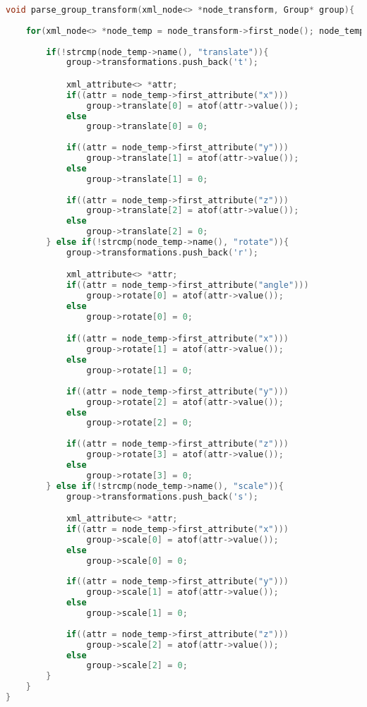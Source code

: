 \documentclass[14pt, a4 paper]{report}
\begin{document}
\begin{lstlisting}[language = c++]
void parse_group_transform(xml_node<> *node_transform, Group* group){
    
    for(xml_node<> *node_temp = node_transform->first_node(); node_temp; node_temp = node_temp->next_sibling()){
        
        if(!strcmp(node_temp->name(), "translate")){
            group->transformations.push_back('t');

            xml_attribute<> *attr;
            if((attr = node_temp->first_attribute("x")))
                group->translate[0] = atof(attr->value());
            else
                group->translate[0] = 0;
        
            if((attr = node_temp->first_attribute("y")))
                group->translate[1] = atof(attr->value());
            else
                group->translate[1] = 0;
        
            if((attr = node_temp->first_attribute("z")))
                group->translate[2] = atof(attr->value());
            else
                group->translate[2] = 0;
        } else if(!strcmp(node_temp->name(), "rotate")){
            group->transformations.push_back('r');

            xml_attribute<> *attr;
            if((attr = node_temp->first_attribute("angle")))
                group->rotate[0] = atof(attr->value());
            else
                group->rotate[0] = 0;

            if((attr = node_temp->first_attribute("x")))
                group->rotate[1] = atof(attr->value());
            else
                group->rotate[1] = 0;
        
            if((attr = node_temp->first_attribute("y")))
                group->rotate[2] = atof(attr->value());
            else
                group->rotate[2] = 0;
        
            if((attr = node_temp->first_attribute("z")))
                group->rotate[3] = atof(attr->value());
            else
                group->rotate[3] = 0;
        } else if(!strcmp(node_temp->name(), "scale")){
            group->transformations.push_back('s');

            xml_attribute<> *attr;
            if((attr = node_temp->first_attribute("x")))
                group->scale[0] = atof(attr->value());
            else
                group->scale[0] = 0;
        
            if((attr = node_temp->first_attribute("y")))
                group->scale[1] = atof(attr->value());
            else
                group->scale[1] = 0;
        
            if((attr = node_temp->first_attribute("z")))
                group->scale[2] = atof(attr->value());
            else
                group->scale[2] = 0;
        }
    }
}
\end{lstlisting}
\end{document}
